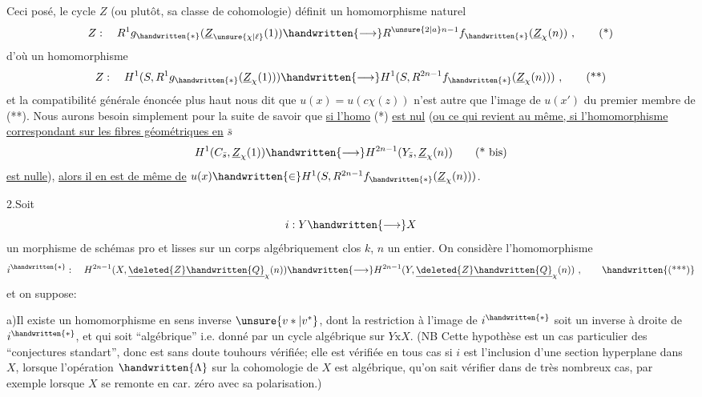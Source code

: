 Ceci posé, le cycle $Z$ (ou plutôt, sa classe de cohomologie) définit un homomorphisme naturel
\[
Z:\quad R^1g_{\handwritten{*}}(\underline{Z}_{\unsure{\chi|\ell}}(1))\handwritten{\longrightarrow}R^{\unsure{2|a}n-1}f_{\handwritten{*}}(\underline{Z}_{\chi}(n))\ ,\tag*{(*)}
\]
d'où un homomorphisme
\[
Z:\quad H^1(S,R^1g_{\handwritten{*}}(\underline{Z}_{\chi}(1)))\handwritten{\longrightarrow}H^1(S,R^{2n-1}f_{\handwritten{*}}(\underline{Z}_{\chi}(n)))\ ,\tag*{(**)}
\]
et la compatibilité générale énoncée plus haut nous dit que $u(x)=u(c\chi(z))$ n'est autre que l'image de $u(x')$ du premier membre de  (**). Nous aurons besoin simplement pour la suite de savoir que \uline{si l'homo} (*) \uline{est nul} (\uline{ou ce qui revient au même, si l'homomorphisme correspondant sur les fibres géométriques en} $\bar s$ 
\[
H^1(C_{\bar s},\underline{Z}_{\chi}(1))\handwritten{\longrightarrow}H^{2n-1}(Y_{\bar s},\underline{Z}_{\chi}(n))\tag*{(* bis)}
\]
\uline{est nulle}), \uline{alors il en est de même de} $u(x)\handwritten{\in}H^1(S,R^{2n-1}f_{\handwritten{*}}(\underline{Z}_{\chi}(n)))$.

2.\quad Soit
\[
i:Y\handwritten{\longrightarrow}X
\]
un morphisme de schémas pro et lisses sur un corps algébriquement clos $k$, $n$ un entier. On  considère l'homomorphisme
\[
i^{\handwritten{*}}:\quad H^{2n-1}(X,\underline{\deleted{Z}\handwritten{Q}}_{\chi}(n))\handwritten{\longrightarrow}H^{2n-1}(Y,\underline{\deleted{Z}\handwritten{Q}}_{\chi}(n))\ ,\tag*{\handwritten{(***)}}
\]
et on suppose:

a)\quad Il existe un homomorphisme en sens inverse $\unsure{v*|v^*}$, dont la restriction à l'image de $i^{\handwritten{*}}$ soit un inverse à droite de $i^{\handwritten{*}}$, et qui soit ``algébrique'' i.e. donné par un cycle algébrique sur $Y\mathbin{\mathrm{x}}X$. (NB Cette hypothèse est un cas particulier des ``conjectures standart'', donc est sans doute touhours vérifiée; elle est vérifiée en tous cas si $i$ est l'inclusion d'une section hyperplane dans $X$, lorsque l'opération $\handwritten{\Lambda}$ sur  la cohomologie de $X$ est algébrique,   qu'on sait vérifier dans de très nombreux cas, par exemple lorsque $X$ se remonte en car. zéro avec sa polarisation.)
